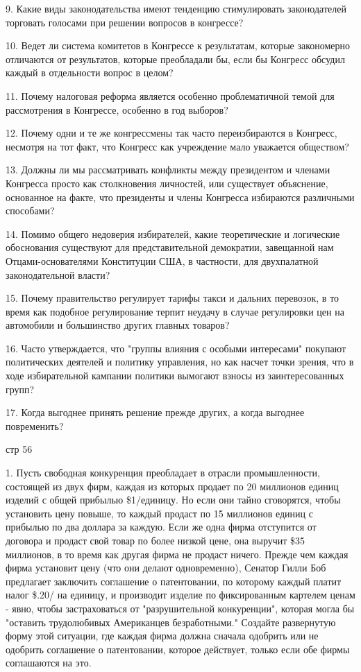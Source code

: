 \documentclass[a4paper,12pt]{article}
\begin{document}
9. Какие виды законодательства имеют тенденцию
стимулировать законодателей торговать голосами при
решении вопросов в конгрессе?

10. Ведет ли система комитетов в Конгрессе к
результатам, которые закономерно отличаются от
результатов, которые преобладали бы, если бы
Конгресс обсудил каждый в отдельности вопрос в
целом?

11. Почему налоговая реформа является особенно
проблематичной темой для рассмотрения в Конгрессе,
особенно в год выборов?

12. Почему одни и те же конгрессмены так часто
переизбираются в Конгресс, несмотря на тот факт,
что Конгресс как учреждение мало уважается
обществом?

13. Должны ли мы рассматривать конфликты между
президентом и членами Конгресса просто как
столкновения личностей, или существует объяснение,
основанное на факте, что президенты и члены
Конгресса избираются различными способами?

14. Помимо общего недоверия избирателей, какие
теоретические и логические обоснования существуют
для представительной демократии, завещанной нам
Отцами-основателями Конституции США, в частности,
для двухпалатной законодательной власти?

15. Почему правительство регулирует тарифы такси и
дальних перевозок, в то время как подобное
регулирование терпит неудачу в случае регулировки
цен на автомобили и большинство других главных
товаров?

16. Часто утверждается, что "группы влияния с
особыми интересами" покупают политических деятелей
и политику управления, но как насчет точки зрения,
что в ходе избирательной кампании политики вымогают
взносы из заинтересованных групп?

17. Когда выгоднее принять решение прежде других, а
когда выгоднее повременить?

стр 56

1. Пусть свободная конкуренция преобладает в
отрасли промышленности, состоящей из двух фирм,
каждая из которых продает по 20 миллионов единиц
изделий с общей прибылью \$1/единицу. Но если они
тайно сговорятся, чтобы установить цену повыше, то
каждый продаст по 15 миллионов единиц с прибылью по
два доллара за каждую. Если же одна фирма
отступится от договора и продаст свой товар по
более низкой цене, она выручит \$35 миллионов, в то
время как другая фирма не продаст ничего. Прежде
чем каждая фирма установит цену (что они делают
одновременно), Сенатор Гилли Боб предлагает
заключить соглашение о патентовании, по которому
каждый платит налог \$.20/ на единицу, и производит
изделие по фиксированным картелем ценам - явно,
чтобы застраховаться от "разрушительной
конкуренции", которая могла бы "оставить
трудолюбивых Американцев безработными." Создайте
развернутую форму этой ситуации, где каждая фирма
должна сначала одобрить или не одобрить соглашение
о патентовании, которое действует, только если обе
фирмы соглашаются на это.
\end{document}
